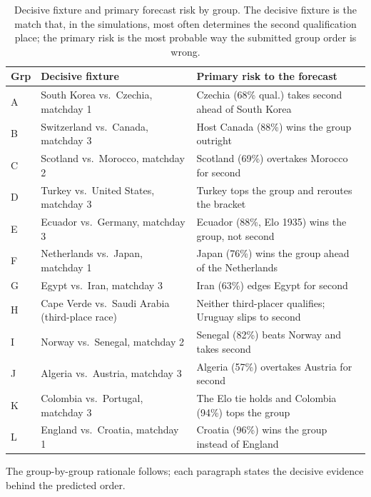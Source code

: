 \documentclass[11pt,letterpaper]{article}
\begin{document}
\begin{table}[ht]
\centering\small
\caption{Decisive fixture and primary forecast risk by group. The decisive fixture is the match that, in the simulations, most often determines the second qualification place; the primary risk is the most probable way the submitted group order is wrong.}
\label{tab:watchrisk}
\begin{tabular}{p{0.5cm}p{5.4cm}p{6.6cm}}
\toprule
Grp & Decisive fixture & Primary risk to the forecast \\
\midrule
A & South Korea vs.\ Czechia, matchday 1 & Czechia (68\% qual.) takes second ahead of South Korea \\
B & Switzerland vs.\ Canada, matchday 3 & Host Canada (88\%) wins the group outright \\
C & Scotland vs.\ Morocco, matchday 2 & Scotland (69\%) overtakes Morocco for second \\
D & Turkey vs.\ United States, matchday 3 & Turkey tops the group and reroutes the bracket \\
E & Ecuador vs.\ Germany, matchday 3 & Ecuador (88\%, Elo 1935) wins the group, not second \\
F & Netherlands vs.\ Japan, matchday 1 & Japan (76\%) wins the group ahead of the Netherlands \\
G & Egypt vs.\ Iran, matchday 3 & Iran (63\%) edges Egypt for second \\
H & Cape Verde vs.\ Saudi Arabia (third-place race) & Neither third-placer qualifies; Uruguay slips to second \\
I & Norway vs.\ Senegal, matchday 2 & Senegal (82\%) beats Norway and takes second \\
J & Algeria vs.\ Austria, matchday 3 & Algeria (57\%) overtakes Austria for second \\
K & Colombia vs.\ Portugal, matchday 3 & The Elo tie holds and Colombia (94\%) tops the group \\
L & England vs.\ Croatia, matchday 1 & Croatia (96\%) wins the group instead of England \\
\bottomrule
\end{tabular}
\end{table}

The group-by-group rationale follows; each paragraph states the decisive evidence behind the predicted order.
\end{document}
